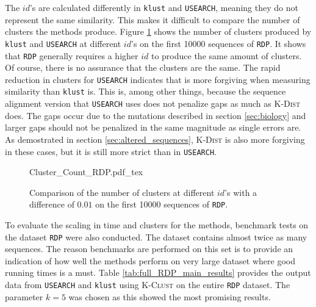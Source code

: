 The $id$'s are calculated differently in \texttt{klust} and \texttt{USEARCH},
meaning they do not represent the same similarity. This makes it difficult to
compare the number of clusters the methods produce. Figure
\ref{fig:id_comparison} shows the number of clusters produced by
\texttt{klust} and \texttt{USEARCH} at different $id$'s on the first
\num{10000} sequences of \texttt{RDP}. It shows that \texttt{RDP} generally
requires a higher $id$ to produce the same amount of clusters. Of course,
there is no assurance that the clusters are the same. The rapid reduction in
clusters for \texttt{USEARCH} indicates that is more forgiving when measuring
similarity than \texttt{klust} is. This is, among other things, because the
sequence alignment version that \texttt{USEARCH} uses does not penalize gaps
as much as \textsc{K-Dist} does. The gaps occur due to the mutations described
in section \ref{sec:biology} and larger gaps should not be penalized in the
same magnitude as single errors are. As demostrated in section
\ref{sec:altered_sequences}, \textsc{K-Dist} is also more forgiving in these
cases, but it is still more strict than in \texttt{USEARCH}.

\begin{figure}[H]
  \centering
  \def\svgwidth{\columnwidth}
  {Cluster_Count_RDP.pdf_tex}
  \caption{Comparison of the number of clusters at different $id$'s with a difference of $0.01$ on the first \num{10000} sequences of \texttt{RDP}.}
  \label{fig:id_comparison}
\end{figure}

To evaluate the scaling in time and clusters for the methods, benchmark
tests on the dataset \texttt{RDP} were also conducted. The dataset contains
almost twice as many sequences. The reason benchmarks are performed on this
set is to provide an indication of how well the methods perform on very large
dataset where good running times is a must. Table
\ref{tab:full_RDP_main_results} provides the output data from \texttt{USEARCH}
and \texttt{klust} using \textsc{K-Clust} on the entire \texttt{RDP} dataset. The parameter $k=5$ was chosen as this showed the most promising results.

